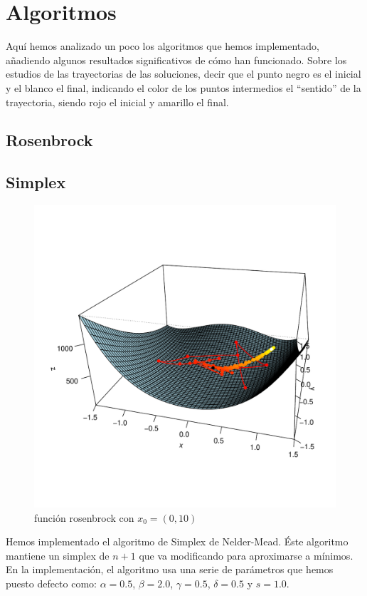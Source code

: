 \documentclass[10pt]{article}
\theoremstyle{definition}
\begin{document}
\section{Algoritmos}
Aquí hemos analizado un poco los algoritmos que hemos implementado, añadiendo algunos resultados significativos de cómo han funcionado. Sobre los estudios de las trayectorias de las soluciones, decir que el punto negro es el inicial y el blanco el final, indicando el color de los puntos intermedios el ``sentido'' de la trayectoria, siendo rojo el inicial y amarillo el final.

\subsection{Rosenbrock} \label{sub:alg-rosenbrock}



\subsection{Simplex} \label{sub:alg-simplex}
\begin{figure}
\vspace{-6.5em}\centering%
\hspace{-4ex}%
\includegraphics[width=1.1\linewidth]{../graphs/rosenbrock_fun/simplex/plot1.pdf}%
\vspace{-5em}
\caption{\small función rosenbrock  con $x_0=(0,10)$} \label{fig:rosen1}
\end{figure}
Hemos implementado el algoritmo de Simplex de Nelder-Mead. Éste
algoritmo mantiene un simplex de $n+1$ que va modificando para
aproximarse a mínimos. En la implementación, el algoritmo usa una
serie de parámetros que hemos puesto defecto como: $\alpha=0.5$,
$\beta=2.0$, $\gamma=0.5$, $\delta=0.5$ y $s=1.0$.
\end{document}
